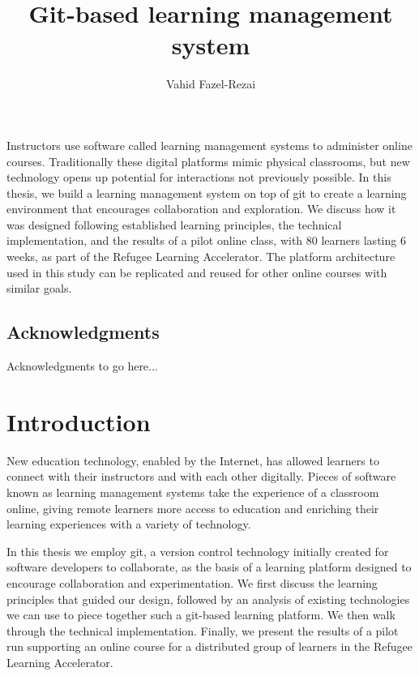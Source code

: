 \documentclass[12pt,twoside,vi]{mitthesis}
\newcommand{\wip}[1]{{\color{red} #1}}
\begin{document}
\title{Git-based learning management system}
\author{Vahid Fazel-Rezai}
\maketitle
\cleardoublepage
\setcounter{savepage}{\thepage}
\begin{abstractpage}
Instructors use software called learning management systems to administer online courses. Traditionally these digital platforms mimic physical classrooms, but new technology opens up potential for interactions not previously possible. In this thesis, we build a learning management system on top of git to create a learning environment that encourages collaboration and exploration. We discuss how it was designed following established learning principles, the technical implementation, and the results of a pilot online class, with 80 learners lasting 6 weeks, as part of the Refugee Learning Accelerator. The platform architecture used in this study can be replicated and reused for other online courses with similar goals.
\end{abstractpage}
\cleardoublepage
\section*{Acknowledgments}
\wip{Acknowledgments to go here...}
\tableofcontents
\newpage
\listoffigures
\newpage
\listoftables
\chapter{Introduction}
New education technology, enabled by the Internet, has allowed learners to connect with their instructors and with each other digitally. Pieces of software known as learning management systems take the experience of a classroom online, giving remote learners more access to education and enriching their learning experiences with a variety of technology.

In this thesis we employ git, a version control technology initially created for software developers to collaborate, as the basis of a learning platform designed to encourage collaboration and experimentation. We first discuss the learning principles that guided our design, followed by an analysis of existing technologies we can use to piece together such a git-based learning platform. We then walk through the technical implementation. Finally, we present the results of a pilot run supporting an online course for a distributed group of learners in the Refugee Learning Accelerator.
\end{document}
